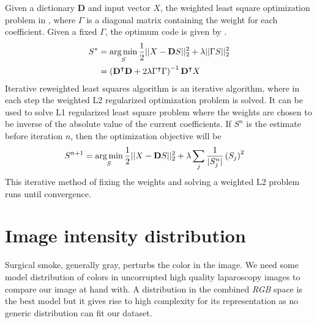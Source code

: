 Given a dictionary $\mathbf{D}$ and input vector $X$, the weighted least square optimization problem in , where $\Gamma$ is a diagonal matrix containing the weight for each coefficient. Given a fixed $\Gamma$, the optimum code is given by .
\begin{align}
    S^* &= \operatorname*{arg\,min}_{S} \frac{1}{2} || X - \mathbf{D} S ||_2^2 + \lambda || \Gamma S ||_2^2 \label{eqn:wls}\\
    &= \left( \mathbf{D}^\intercal \mathbf{D} + 2 \lambda \Gamma^\intercal \Gamma \right)^{-1} \mathbf{D}^\intercal X \label{eqn:wlsSolution}
\end{align}
Iterative reweighted least squares algorithm is an iterative algorithm, where in each step the weighted L2 regularized optimization problem is solved. It can be used to solve L1 regularized least square problem where the weights are chosen to be inverse of the absolute value of the current coefficients. If $S^n$ is the estimate before iteration $n$, then the optimization objective will be
\begin{align}
    S^{n+1} &= \operatorname*{arg\,min}_{S} \frac{1}{2} || X - \mathbf{D} S ||_2^2 + \lambda \sum_{j} \frac{1}{| S_j^n |} \left( S_j \right)^2 \label{eqn:irls_l1} 
\end{align}
This iterative method of fixing the weights and solving a weighted L2 problem runs until convergence.



\section{Image intensity distribution}
Surgical smoke, generally gray, perturbs the color in the image. We need some model distribution of colors in uncorrupted high quality laparoscopy images to compare our image at hand with. A distribution in the combined \textit{RGB} space is the best model but it gives rise to high complexity for its representation as no generic distribution can fit our dataset.

